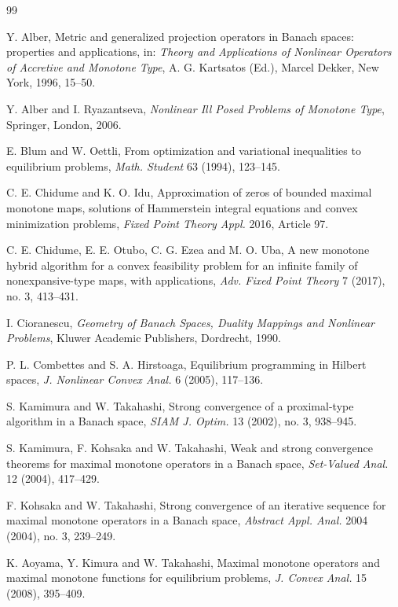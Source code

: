\documentclass[leqno,12pt]{amsart}
\theoremstyle{definition}
\numberwithin{equation}{section}
\begin{document}
\begin{thebibliography}{99}

Y. Alber, Metric and generalized projection operators in Banach spaces: properties and applications, in: \emph{Theory and Applications of Nonlinear Operators of Accretive and Monotone Type}, A. G. Kartsatos (Ed.), Marcel Dekker, New York, 1996, 15--50.

Y. Alber and I. Ryazantseva, \emph{Nonlinear Ill Posed Problems of Monotone Type}, Springer, London, 2006.

E. Blum and W. Oettli, From optimization and variational inequalities to equilibrium problems, \emph{Math. Student} 63 (1994), 123--145.

C. E. Chidume and K. O. Idu, Approximation of zeros of bounded maximal monotone maps, solutions of Hammerstein integral equations and convex minimization problems, \emph{Fixed Point Theory Appl.} 2016, Article 97.

C. E. Chidume, E. E. Otubo, C. G. Ezea and M. O. Uba, A new monotone hybrid algorithm for a convex feasibility problem for an infinite family of nonexpansive-type maps, with applications, \emph{Adv. Fixed Point Theory} 7 (2017), no. 3, 413--431.

I. Cioranescu, \emph{Geometry of Banach Spaces, Duality Mappings and Nonlinear Problems}, Kluwer Academic Publishers, Dordrecht, 1990.

P. L. Combettes and S. A. Hirstoaga, Equilibrium programming in Hilbert spaces, \emph{J. Nonlinear Convex Anal.} 6 (2005), 117--136.

S. Kamimura and W. Takahashi, Strong convergence of a proximal-type algorithm in a Banach space, \emph{SIAM J. Optim.} 13 (2002), no. 3, 938--945.

S. Kamimura, F. Kohsaka and W. Takahashi, Weak and strong convergence theorems for maximal monotone operators in a Banach space, \emph{Set-Valued Anal.} 12 (2004), 417--429.

F. Kohsaka and W. Takahashi, Strong convergence of an iterative sequence for maximal monotone operators in a Banach space, \emph{Abstract Appl. Anal.} 2004 (2004), no. 3, 239--249.

K. Aoyama, Y. Kimura and W. Takahashi, Maximal monotone operators and maximal monotone functions for equilibrium problems, \emph{J. Convex Anal.} 15 (2008), 395--409.


\end{thebibliography}
\end{document}
